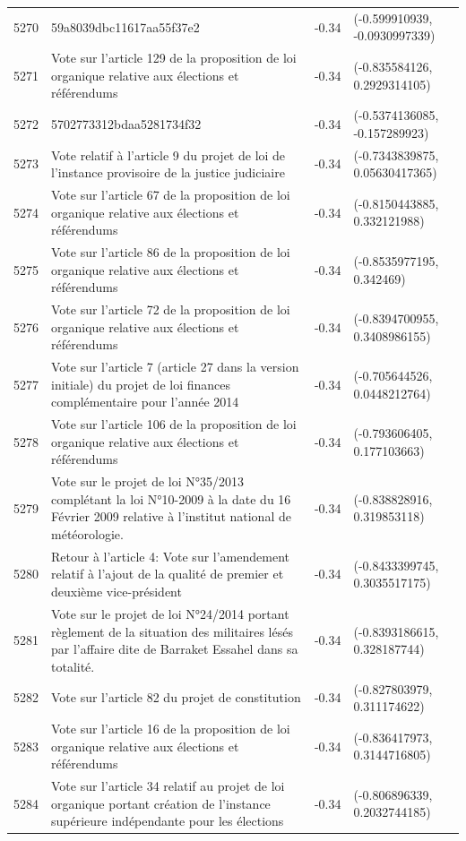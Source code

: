 \begin{table}[ht]
\begin{tabular}{rlrl}
  5270 & 59a8039dbc11617aa55f37e2 & -0.34 & (-0.599910939, -0.0930997339) \\ 
  5271 & Vote sur l'article 129 de la proposition de loi organique relative aux élections et référendums & -0.34 & (-0.835584126, 0.2929314105) \\ 
  5272 & 5702773312bdaa5281734f32 & -0.34 & (-0.5374136085, -0.157289923) \\ 
  5273 & Vote relatif à l'article 9 du projet de loi de l'instance provisoire de la justice judiciaire & -0.34 & (-0.7343839875, 0.05630417365) \\ 
  5274 & Vote sur l'article 67 de la proposition de loi organique relative aux élections et référendums & -0.34 & (-0.8150443885, 0.332121988) \\ 
  5275 & Vote sur l'article 86 de la proposition de loi organique relative aux élections et référendums & -0.34 & (-0.8535977195, 0.342469) \\ 
  5276 & Vote sur l'article 72 de la proposition de loi organique relative aux élections et référendums & -0.34 & (-0.8394700955, 0.3408986155) \\ 
  5277 & Vote sur l'article 7 (article 27 dans la version initiale) du projet de loi finances complémentaire pour l'année 2014 & -0.34 & (-0.705644526, 0.0448212764) \\ 
  5278 & Vote sur l'article 106 de la proposition de loi organique relative aux élections et référendums & -0.34 & (-0.793606405, 0.177103663) \\ 
  5279 & Vote sur le projet de loi N°35/2013 complétant la loi N°10-2009 à la date du 16 Février 2009 relative à l'institut national de météorologie. & -0.34 & (-0.838828916, 0.319853118) \\ 
  5280 & Retour à l'article 4: Vote sur l'amendement relatif à l'ajout de la qualité de premier et deuxième vice-président & -0.34 & (-0.8433399745, 0.3035517175) \\ 
  5281 & Vote sur le projet de loi N°24/2014 portant règlement de la situation des militaires lésés par l’affaire dite de Barraket Essahel dans sa totalité. & -0.34 & (-0.8393186615, 0.328187744) \\ 
  5282 & Vote sur l'article 82 du projet de constitution & -0.34 & (-0.827803979, 0.311174622) \\ 
  5283 & Vote sur l'article 16 de la proposition de loi organique relative aux élections et référendums & -0.34 & (-0.836417973, 0.3144716805) \\ 
  5284 & Vote sur l'article 34 relatif au projet de loi organique portant création de l'instance supérieure indépendante pour les élections & -0.34 & (-0.806896339, 0.2032744185) \\ 

\end{tabular}
\end{table}
